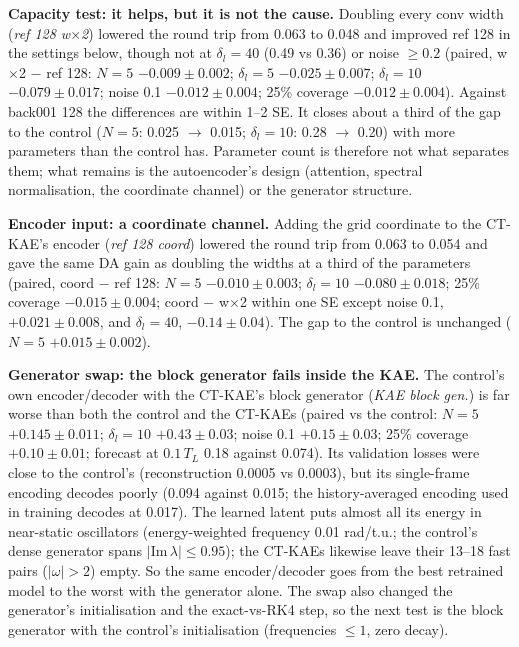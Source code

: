 \documentclass[10pt]{article}
\begin{document}
\textbf{Capacity test: it helps, but it is not the cause.} Doubling every conv width (\emph{ref 128
w$\times$2}) lowered the round trip from 0.063 to 0.048 and improved ref 128 in the settings below, though not at $\delta_l = 40$ (0.49 vs 0.36) or noise $\ge 0.2$
(paired, w$\times$2 $-$ ref 128: $N = 5$ $-0.009 \pm 0.002$; $\delta_l = 5$ $-0.025 \pm 0.007$;
$\delta_l = 10$ $-0.079 \pm 0.017$; noise 0.1 $-0.012 \pm 0.004$; 25\% coverage $-0.012 \pm
0.004$). Against back001 128 the differences are within 1--2 SE. It closes about a third of the
gap to the control ($N = 5$: 0.025 $\to$ 0.015; $\delta_l = 10$: 0.28 $\to$ 0.20) with more
parameters than the control has. Parameter count is therefore not what separates them; what
remains is the autoencoder's design (attention, spectral normalisation, the coordinate channel) or
the generator structure.

\textbf{Encoder input: a coordinate channel.} Adding the grid coordinate to the CT-KAE's encoder
(\emph{ref 128 coord}) lowered the round trip from 0.063 to 0.054 and gave the same DA gain as
doubling the widths at a third of the parameters (paired, coord $-$ ref 128: $N = 5$ $-0.010 \pm
0.003$; $\delta_l = 10$ $-0.080 \pm 0.018$; 25\% coverage $-0.015 \pm 0.004$; coord $-$ w$\times$2
within one SE except noise 0.1, $+0.021 \pm 0.008$, and $\delta_l = 40$, $-0.14 \pm 0.04$). The
gap to the control is unchanged ($N = 5$ $+0.015 \pm 0.002$).

\textbf{Generator swap: the block generator fails inside the KAE.} The control's own
encoder/decoder with the CT-KAE's block generator (\emph{KAE block gen.}) is far worse than both
the control and the CT-KAEs (paired vs the control: $N = 5$ $+0.145 \pm 0.011$; $\delta_l = 10$
$+0.43 \pm 0.03$; noise 0.1 $+0.15 \pm 0.03$; 25\% coverage $+0.10 \pm 0.01$; forecast at
$0.1\,T_L$ 0.18 against 0.074). Its validation losses were close to the control's (reconstruction
0.0005 vs 0.0003), but its single-frame encoding decodes poorly (0.094 against 0.015; the
history-averaged encoding used in training decodes at 0.017). The learned latent puts almost all
its energy in near-static oscillators (energy-weighted frequency 0.01 rad/t.u.; the control's
dense generator spans $|\mathrm{Im}\,\lambda| \le 0.95$); the CT-KAEs likewise leave their 13--18
fast pairs ($|\omega| > 2$) empty. So the same encoder/decoder goes from the best retrained model to the
worst with the generator alone. The swap also changed the generator's initialisation and the
exact-vs-RK4 step, so the next test is the block generator with the control's initialisation
(frequencies $\le 1$, zero decay).
\end{document}
